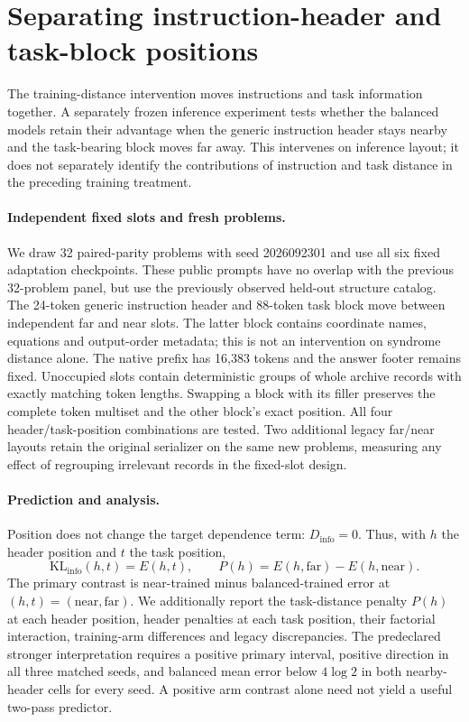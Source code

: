 \section{Separating instruction-header and task-block positions}
\label{app:header-distance}
The training-distance intervention moves instructions and task information
together. A separately frozen inference experiment tests whether the balanced
models retain their advantage when the generic instruction header stays
nearby and the task-bearing block moves far away. This intervenes on inference
layout; it does not separately identify the contributions of instruction and
task distance in the preceding training treatment.

\paragraph{Independent fixed slots and fresh problems.}
We draw 32 paired-parity problems with seed 2026092301 and use all six fixed
adaptation checkpoints. These public prompts have no overlap with the previous
32-problem panel, but use the previously observed held-out structure catalog.
The 24-token generic instruction header and 88-token task block move between
independent far and near slots. The latter block contains coordinate names,
equations and output-order metadata; this is not an intervention on syndrome
distance alone. The native prefix has 16,383 tokens and the answer footer
remains fixed. Unoccupied slots contain deterministic groups of whole archive
records with exactly matching token lengths. Swapping a block with its filler
preserves the complete token multiset and the other block's exact position.
All four header/task-position combinations are tested. Two additional legacy
far/near layouts retain the original serializer on the same new problems,
measuring any effect of regrouping irrelevant records in the fixed-slot design.

\paragraph{Prediction and analysis.}
Position does not change the target dependence term: $D_{\mathrm{info}}=0$.
Thus, with $h$ the header position and $t$ the task position,
\begin{equation}
 \mathrm{KL}_{\mathrm{info}}(h,t)=E(h,t),\qquad
 P(h)=E(h,\mathrm{far})-E(h,\mathrm{near}).
\end{equation}
The primary contrast is near-trained minus balanced-trained error at
$(h,t)=(\mathrm{near},\mathrm{far})$. We additionally report the task-distance
penalty $P(h)$ at each header position, header penalties at each task position,
their factorial interaction, training-arm differences and legacy discrepancies.
The predeclared stronger interpretation requires a positive primary interval,
positive direction in all three matched seeds, and balanced mean error below
$4\log2$ in both nearby-header cells for every seed. A positive arm contrast
alone need not yield a useful two-pass predictor.

